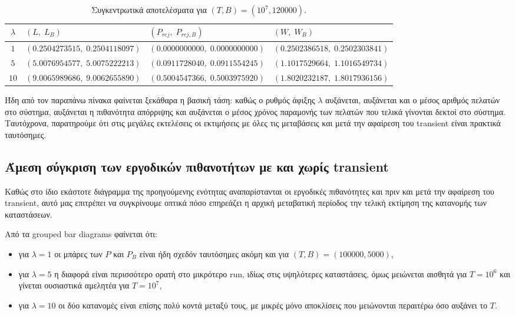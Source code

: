 \documentclass{article}
\begin{document}
\begin{table}[h!]
\centering
\caption{Συγκεντρωτικά αποτελέσματα για $(T,B)=(10^7,120000)$.}
\begin{tabular}{|c|P{4.7cm}|P{4.7cm}|P{4.7cm}|}
\hline
$\lambda$ & $(L,\;L_B)$ & $(P_{rej},\;P_{rej,B})$ & $(W,\;W_B)$ \\ \hline
$1$  & $(0.2504273515,\;0.2504118097)$ & $(0.0000000000,\;0.0000000000)$ & $(0.2502386518,\;0.2502303841)$ \\ \hline
$5$  & $(5.0076954577,\;5.0075222213)$ & $(0.0911728040,\;0.0911554245)$ & $(1.1017529664,\;1.1016549734)$ \\ \hline
$10$ & $(9.0065989686,\;9.0062655890)$ & $(0.5004547366,\;0.5003975920)$ & $(1.8020232187,\;1.8017936156)$ \\ \hline
\end{tabular}
\end{table}

Ήδη από τον παραπάνω πίνακα φαίνεται ξεκάθαρα η βασική τάση: καθώς ο ρυθμός άφιξης $\lambda$ αυξάνεται, αυξάνεται και ο μέσος αριθμός πελατών στο σύστημα, αυξάνεται η πιθανότητα απόρριψης και αυξάνεται ο μέσος χρόνος παραμονής των πελατών που τελικά γίνονται δεκτοί στο σύστημα. Ταυτόχρονα, παρατηρούμε ότι στις μεγάλες εκτελέσεις οι εκτιμήσεις με όλες τις μεταβάσεις και μετά την αφαίρεση του transient είναι πρακτικά ταυτόσημες.

\subsection{Άμεση σύγκριση των εργοδικών πιθανοτήτων με και χωρίς transient}

Καθώς στο ίδιο εκάστοτε διάγραμμα της προηγούμενης ενότητας αναπαρίστανται οι εργοδικές πιθανότητες και πριν και μετά την αφαίρεση του transient, αυτό μας επιτρέπει να συγκρίνουμε οπτικά πόσο επηρεάζει η αρχική μεταβατική περίοδος την τελική εκτίμηση της κατανομής των καταστάσεων.

Από τα grouped bar diagrams φαίνεται ότι:

\begin{itemize}
    \item για $\lambda=1$ οι μπάρες των $P$ και $P_B$ είναι ήδη σχεδόν ταυτόσημες ακόμη και για $(T,B)=(100000,5000)$,
    \item για $\lambda=5$ η διαφορά είναι περισσότερο ορατή στο μικρότερο run, ιδίως στις υψηλότερες καταστάσεις, όμως μειώνεται αισθητά για $T=10^6$ και γίνεται ουσιαστικά αμελητέα για $T=10^7$,
    \item για $\lambda=10$ οι δύο κατανομές είναι επίσης πολύ κοντά μεταξύ τους, με μικρές μόνο αποκλίσεις που μειώνονται περαιτέρω όσο αυξάνει το $T$.
\end{itemize}
\end{document}
